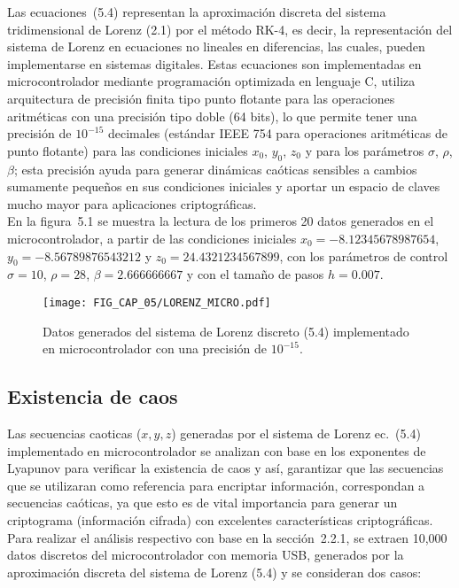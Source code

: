 Las ecuaciones~(5.4) representan la aproximación discreta del sistema tridimensional de Lorenz (2.1) por el método RK-4, es decir, la representación del sistema de Lorenz en ecuaciones no lineales en diferencias, las cuales, pueden implementarse en sistemas digitales. Estas ecuaciones son implementadas en microcontrolador mediante programación optimizada en lenguaje C, utiliza arquitectura de precisión finita tipo punto flotante para las operaciones aritméticas con una precisión tipo doble (64 bits), lo que permite tener una precisión de $10^{-15}$ decimales (estándar IEEE 754 para operaciones aritméticas de punto flotante) para las condiciones iniciales $x_{0}$, $y_{0}$, $z_{0}$ y para los parámetros $\sigma$, $\rho$, $\beta$; esta precisión ayuda para generar dinámicas caóticas sensibles a cambios sumamente pequeños en sus condiciones iniciales y aportar un espacio de claves mucho mayor para aplicaciones criptográficas. \\

En la figura~5.1 se muestra la lectura de los primeros 20 datos generados en el microcontrolador, a partir de las condiciones iniciales $x_{0}= -8.12345678987654$, $y_{0}=-8.56789876543212$ y $z_{0}=24.4321234567899$, con los parámetros de control $\sigma=10$, $\rho=28$, $\beta=2.666666667$ y con el tamaño de pasos $h=0.007$. 

\begin{figure}[!htbp] %
	\center
	\texttt{[image: FIG\_CAP\_05/LORENZ\_MICRO.pdf]}    
	\caption{Datos generados del sistema de Lorenz discreto (5.4) implementado en microcontrolador con una precisión de $10^{-15}$.}
\end{figure}

\subsection{Existencia de caos}
Las secuencias caoticas ($x,y,z$) generadas por el sistema de Lorenz ec.~(5.4) implementado en microcontrolador se analizan con base en los exponentes de Lyapunov para verificar la existencia de caos y así, garantizar que las secuencias que se utilizaran como referencia para encriptar información, correspondan a secuencias caóticas, ya que esto es de vital importancia para generar un criptograma (información cifrada) con excelentes características criptográficas. \\ 

Para realizar el análisis respectivo con base en la sección~2.2.1, se extraen 10,000 datos discretos del microcontrolador con memoria USB, generados por la aproximación discreta del sistema de Lorenz (5.4) y se consideran dos casos:


